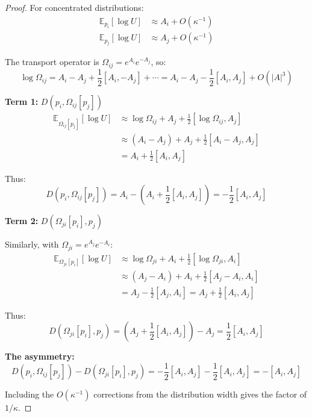 \documentclass[11pt,a4paper]{article}
\newcommand{\E}{\mathbb{E}}
\begin{document}
\begin{proof}
For concentrated distributions:
\begin{align}
    \E_{p_i}[\log U] &\approx A_i + O(\kappa^{-1}) \\
    \E_{p_j}[\log U] &\approx A_j + O(\kappa^{-1})
\end{align}

The transport operator is $\Omega_{ij} = e^{A_i} e^{-A_j}$, so:
\begin{equation}
    \log\Omega_{ij} = A_i - A_j + \frac{1}{2}[A_i, -A_j] + \cdots = A_i - A_j - \frac{1}{2}[A_i, A_j] + O(|A|^3)
\end{equation}

\textbf{Term 1:} $D(p_i, \Omega_{ij}[p_j])$
\begin{align}
    \E_{\Omega_{ij}[p_j]}[\log U] &\approx \log\Omega_{ij} + A_j + \frac{1}{2}[\log\Omega_{ij}, A_j] \\
    &\approx (A_i - A_j) + A_j + \frac{1}{2}[A_i - A_j, A_j] \\
    &= A_i + \frac{1}{2}[A_i, A_j]
\end{align}

Thus:
\begin{equation}
    D(p_i, \Omega_{ij}[p_j]) = A_i - \left(A_i + \frac{1}{2}[A_i, A_j]\right) = -\frac{1}{2}[A_i, A_j]
\end{equation}

\textbf{Term 2:} $D(\Omega_{ji}[p_i], p_j)$

Similarly, with $\Omega_{ji} = e^{A_j} e^{-A_i}$:
\begin{align}
    \E_{\Omega_{ji}[p_i]}[\log U] &\approx \log\Omega_{ji} + A_i + \frac{1}{2}[\log\Omega_{ji}, A_i] \\
    &\approx (A_j - A_i) + A_i + \frac{1}{2}[A_j - A_i, A_i] \\
    &= A_j - \frac{1}{2}[A_j, A_i] = A_j + \frac{1}{2}[A_i, A_j]
\end{align}

Thus:
\begin{equation}
    D(\Omega_{ji}[p_i], p_j) = \left(A_j + \frac{1}{2}[A_i, A_j]\right) - A_j = \frac{1}{2}[A_i, A_j]
\end{equation}

\textbf{The asymmetry:}
\begin{equation}
    D(p_i, \Omega_{ij}[p_j]) - D(\Omega_{ji}[p_i], p_j) = -\frac{1}{2}[A_i, A_j] - \frac{1}{2}[A_i, A_j] = -[A_i, A_j]
\end{equation}

Including the $O(\kappa^{-1})$ corrections from the distribution width gives the factor of $1/\kappa$.
\end{proof}
\end{document}
